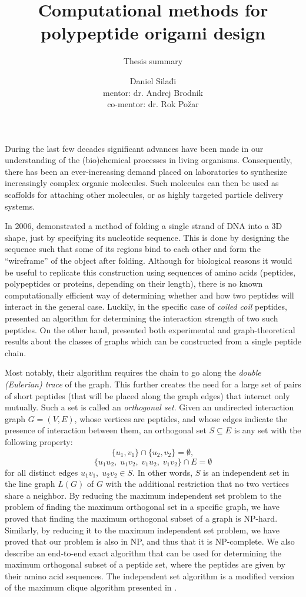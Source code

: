\documentclass[a4paper]{scrartcl}
\title{Computational methods for polypeptide origami design}
\subtitle{Thesis summary}
\author{Daniel Silađi\\
mentor: dr. Andrej Brodnik\\
co-mentor: dr. Rok Požar}
\begin{document}
	\maketitle
	During the last few decades significant advances have been made in our understanding of the (bio)chemical processes in living organisms. Consequently, there has been an ever-increasing demand placed on laboratories to synthesize increasingly complex organic molecules. Such molecules can then be used as scaffolds for attaching other molecules, or as highly targeted particle delivery systems.
	
	In 2006, \cite{rothemund2006folding} demonstrated a method of folding a single strand of DNA into a 3D shape, just by specifying its nucleotide sequence. This is done by designing the sequence such that some of its regions bind to each other and form the ``wireframe'' of the object after folding. Although for biological reasons it would be useful to replicate this construction using sequences of amino acids (peptides, polypeptides or proteins, depending on their length), there is no known computationally efficient way of determining whether and how two peptides will interact in the general case. Luckily, in the specific case of \emph{coiled coil} peptides, \cite{potapov2015data} presented an algorithm for determining the interaction strength of two such peptides. On the other hand, \cite{gradivsar2013design} presented both experimental and graph-theoretical results about the classes of graphs which can be constructed from a single peptide chain. 
	
	Most notably, their algorithm requires the chain to go along the \emph{double (Eulerian) trace} of the graph. This further creates the need for a large set of pairs of short peptides (that will be placed along the graph edges) that interact only mutually. Such a set is called an \emph{orthogonal set}. Given an undirected interaction graph $G = (V, E)$, whose vertices are peptides, and whose edges indicate the presence of interaction between them, an orthogonal set $S \subseteq E$ is any set with the following property:
	\[  \{u_1,v_1\} \cap \{u_2, v_2\} = \emptyset,\] 
	\[ \{u_1u_2,\; u_1v_2,\; v_1u_2,\; v_1v_2\} \cap E = \emptyset \]
	for all distinct edges $u_1v_1,\;u_2v_2 \in S$. In other words, $S$ is an independent set in the line graph $L(G)$ of $G$ with the additional restriction that no two vertices share a neighbor. By reducing the maximum independent set problem to the problem of finding the maximum orthogonal set in a specific graph, we have proved that finding the maximum orthogonal subset of a graph is NP-hard. Similarly, by reducing it to the maximum independent set problem, we have proved that our problem is also in NP, and thus that it is NP-complete. We also describe an end-to-end exact algorithm that can be used for determining the maximum orthogonal subset of a peptide set, where the peptides are given by their amino acid sequences. The independent set algorithm is a modified version of the maximum clique algorithm presented in \cite{depolli2013exact}.
	
\end{document}
